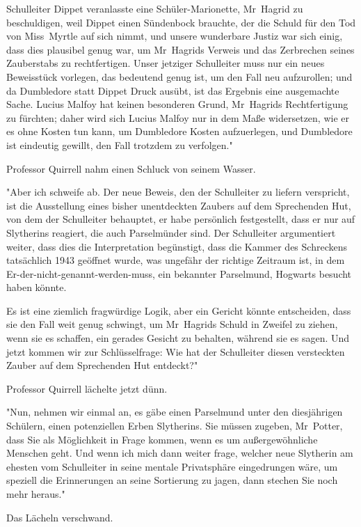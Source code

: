{Schulleiter Dippet veranlasste eine Schüler-Marionette, Mr~Hagrid zu beschuldigen, weil Dippet einen Sündenbock brauchte, der die Schuld für den Tod von Miss~Myrtle auf sich nimmt, und unsere wunderbare Justiz war sich einig, dass dies plausibel genug war, um Mr~Hagrids Verweis und das Zerbrechen seines Zauberstabs zu rechtfertigen. Unser jetziger Schulleiter muss nur ein neues Beweisstück vorlegen, das bedeutend genug ist, um den Fall neu aufzurollen; und da Dumbledore statt Dippet Druck ausübt, ist das Ergebnis eine ausgemachte Sache. Lucius Malfoy hat keinen besonderen Grund, Mr~Hagrids Rechtfertigung zu fürchten; daher wird sich Lucius Malfoy nur in dem Maße widersetzen, wie er es ohne Kosten tun kann, um Dumbledore Kosten aufzuerlegen, und Dumbledore ist eindeutig gewillt, den Fall trotzdem zu verfolgen."

Professor Quirrell nahm einen Schluck von seinem Wasser.

"Aber ich schweife ab. Der neue Beweis, den der Schulleiter zu liefern verspricht, ist die Ausstellung eines bisher unentdeckten Zaubers auf dem Sprechenden Hut, von dem der Schulleiter behauptet, er habe persönlich festgestellt, dass er nur auf Slytherins reagiert, die auch Parselmünder sind. Der Schulleiter argumentiert weiter, dass dies die Interpretation begünstigt, dass die Kammer des Schreckens tatsächlich 1943 geöffnet wurde, was ungefähr der richtige Zeitraum ist, in dem Er-der-nicht-genannt-werden-muss, ein bekannter Parselmund, Hogwarts besucht haben könnte.

Es ist eine ziemlich fragwürdige Logik, aber ein Gericht könnte entscheiden, dass sie den Fall weit genug schwingt, um Mr~Hagrids Schuld in Zweifel zu ziehen, wenn sie es schaffen, ein gerades Gesicht zu behalten, während sie es sagen. Und jetzt kommen wir zur Schlüsselfrage: Wie hat der Schulleiter diesen versteckten Zauber auf dem Sprechenden Hut entdeckt?"

Professor Quirrell lächelte jetzt dünn.

"Nun, nehmen wir einmal an, es gäbe einen Parselmund unter den diesjährigen Schülern, einen potenziellen Erben Slytherins. Sie müssen zugeben, Mr~Potter, dass Sie als Möglichkeit in Frage kommen, wenn es um außergewöhnliche Menschen geht. Und wenn ich mich dann weiter frage, welcher neue Slytherin am ehesten vom Schulleiter in seine mentale Privatsphäre eingedrungen wäre, um speziell die Erinnerungen an seine Sortierung zu jagen, dann stechen Sie noch mehr heraus."

Das Lächeln verschwand.

}

